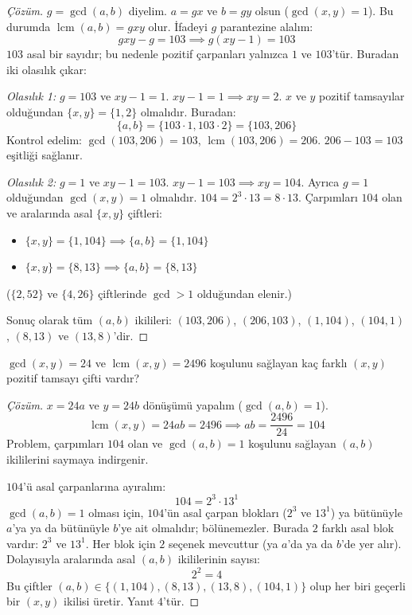 \begin{proof}[Çözüm]
$g = \gcd(a, b)$ diyelim. $a = gx$ ve $b = gy$ olsun ($\gcd(x, y) = 1$).
Bu durumda $\operatorname{lcm}(a, b) = gxy$ olur. İfadeyi $g$ parantezine alalım:
\[ gxy - g = 103 \implies g(xy - 1) = 103 \]
$103$ asal bir sayıdır; bu nedenle pozitif çarpanları yalnızca $1$ ve $103$'tür. Buradan iki olasılık çıkar:

\textit{Olasılık 1:} $g = 103$ ve $xy - 1 = 1$.
$xy - 1 = 1 \implies xy = 2$.
$x$ ve $y$ pozitif tamsayılar olduğundan $\{x, y\} = \{1, 2\}$ olmalıdır.
Buradan:
\[ \{a, b\} = \{103 \cdot 1, 103 \cdot 2\} = \{103, 206\} \]
Kontrol edelim: $\gcd(103, 206) = 103$, $\operatorname{lcm}(103, 206) = 206$.
$206 - 103 = 103$ eşitliği sağlanır.

\textit{Olasılık 2:} $g = 1$ ve $xy - 1 = 103$.
$xy - 1 = 103 \implies xy = 104$.
Ayrıca $g = 1$ olduğundan $\gcd(x, y) = 1$ olmalıdır.
$104 = 2^3 \cdot 13 = 8 \cdot 13$.
Çarpımları $104$ olan ve aralarında asal $\{x, y\}$ çiftleri:
\begin{itemize}
    \item $\{x, y\} = \{1, 104\} \implies \{a, b\} = \{1, 104\}$
    \item $\{x, y\} = \{8, 13\} \implies \{a, b\} = \{8, 13\}$
\end{itemize}
($\{2, 52\}$ ve $\{4, 26\}$ çiftlerinde $\gcd > 1$ olduğundan elenir.)

Sonuç olarak tüm $(a, b)$ ikilileri: $(103, 206)$, $(206, 103)$, $(1, 104)$, $(104, 1)$, $(8, 13)$ ve $(13, 8)$'dir.
\end{proof}

\begin{example}
$\gcd(x, y) = 24$ ve $\operatorname{lcm}(x, y) = 2496$ koşulunu sağlayan kaç farklı $(x, y)$ pozitif tamsayı çifti vardır?
\end{example}

\begin{proof}[Çözüm]
$x = 24a$ ve $y = 24b$ dönüşümü yapalım ($\gcd(a, b) = 1$).
\[ \operatorname{lcm}(x, y) = 24ab = 2496 \implies ab = \frac{2496}{24} = 104 \]
Problem, çarpımları $104$ olan ve $\gcd(a, b) = 1$ koşulunu sağlayan $(a, b)$ ikililerini saymaya indirgenir.

$104$'ü asal çarpanlarına ayıralım:
\[ 104 = 2^3 \cdot 13^1 \]
$\gcd(a, b) = 1$ olması için, $104$'ün asal çarpan blokları ($2^3$ ve $13^1$) ya bütünüyle $a$'ya ya da bütünüyle $b$'ye ait olmalıdır; bölünemezler.
Burada $2$ farklı asal blok vardır: $2^3$ ve $13^1$.
Her blok için $2$ seçenek mevcuttur (ya $a$'da ya da $b$'de yer alır).
Dolayısıyla aralarında asal $(a, b)$ ikililerinin sayısı:
\[ 2^2 = 4 \]
Bu çiftler $(a, b) \in \{(1, 104), (8, 13), (13, 8), (104, 1)\}$ olup her biri geçerli bir $(x, y)$ ikilisi üretir. Yanıt $4$'tür.
\end{proof}

